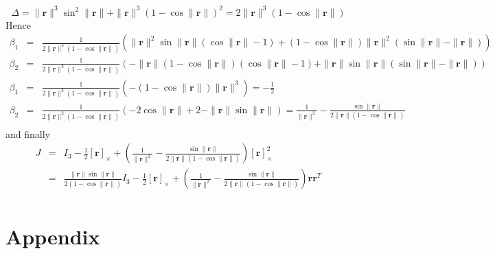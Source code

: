 \documentclass {article}
\newcommand\rot{\mathbf{r}}
\newcommand\rcross{[\rot]_{\times}}
\newcommand\normr{\|\rot\|}
\begin{document}
$$
\Delta = \normr^3\sin^2\normr + \normr^3 (1-\cos\normr)^2 = 2\normr^3(1 -\cos\normr)
$$
Hence
\begin{eqnarray*}
\beta_1 &=& \frac{1}{2\normr^3(1 -\cos\normr)}\left(\normr^2\sin\normr (\cos \normr - 1) + (1 - \cos \normr)\normr^2(\sin\normr - \normr)\right) \\
\beta_2 &=& \frac{1}{2\normr^3(1 -\cos\normr)}\left(-\normr(1 - \cos \normr)(\cos \normr - 1) + \normr\sin\normr(\sin\normr - \normr)\right)\\
\beta_1 &=& \frac{1}{2\normr^3(1 -\cos\normr)}\left(-(1 - \cos \normr)\normr^3\right) = -\frac{1}{2}\\
\beta_2 &=& \frac{1}{2\normr^2(1 -\cos\normr)}\left(-2\cos \normr + 2 - \normr\sin\normr\right) = \frac{1}{\normr^2} - \frac{\sin\normr}{2\normr(1-\cos\normr)}\\
\end{eqnarray*}
and finally
\begin{eqnarray*}
J &=& I_3 -\frac{1}{2}\rcross +  \left(\frac{1}{\normr^2} - \frac{\sin\normr}{2\normr(1-\cos\normr)}\right)\rcross^2\\
&=& \frac{\normr\sin\normr}{2(1-\cos\normr)} I_3 - \frac{1}{2}\rcross +  \left(\frac{1}{\normr^2} - \frac{\sin\normr}{2\normr(1-\cos\normr)}\right)\rot\rot^T\\
\end{eqnarray*}



\section{Appendix}
\end{document}
